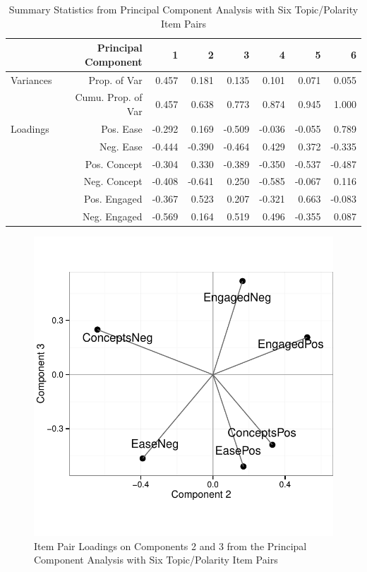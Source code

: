 \documentclass{article}\usepackage[]{graphicx}\usepackage[]{color}
\newenvironment{knitrout}{}{} %
\begin{document}
\begin{table}[H]
\centering
\begin{tabular}{lrrrrrrr}
\hline 
& Principal Component & 1 & 2 & 3 & 4 & 5 & 6 \\ 
\hline
Variances \hspace{.1in} & Prop. of Var & 0.457 & 0.181  & 0.135 & 0.101 & 0.071 & 0.055  \\
& Cumu. Prop. of Var & 0.457 & 0.638  & 0.773 & 0.874 & 0.945 & 1.000  \\
\hline
Loadings & Pos. Ease & -0.292 & 0.169 & -0.509 & -0.036 & -0.055 & 0.789\\
& Neg. Ease &  -0.444 & -0.390 & -0.464 & 0.429 & 0.372 & -0.335\\
& Pos. Concept &  -0.304 & 0.330 & -0.389 & -0.350 & -0.537 & -0.487\\
& Neg. Concept &  -0.408 & -0.641 & 0.250 & -0.585 & -0.067 & 0.116\\
& Pos. Engaged &  -0.367 & 0.523 & 0.207 & -0.321 & 0.663 & -0.083\\
& Neg. Engaged &  -0.569 & 0.164 & 0.519 & 0.496 & -0.355 & 0.087\\
\hline
\end{tabular}
\caption{Summary Statistics from Principal Component Analysis with Six Topic/Polarity Item Pairs} 
\label{pc6table}
\end{table}

\begin{knitrout}
\color{fgcolor}\begin{figure}[hbt]


{\centering \includegraphics[width=.5\linewidth]{figure/PCA6plot-1} 

}

\caption[Item Pair Loadings on Components 2 and 3 from the Principal Component Analysis with Six Topic/Polarity Item Pairs]{Item Pair Loadings on Components 2 and 3 from the Principal Component Analysis with Six Topic/Polarity Item Pairs\label{fig:PCA6plot}}
\end{figure}


\end{knitrout}
\end{document}
